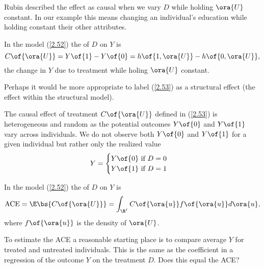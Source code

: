 Rubin described the effect as causal when we vary $D$ while holding $\ora{U}$ constant. In our example this means changing an individual's education while holding constant their other attributes.

\begin{definition}
    In the model (\ref{2.52}) the  of $D$ on $Y$ is 
    \begin{equation}
        \label{2.53}
        C\of{\ora{U}} = Y\of{1} - Y\of{0} = h\of{1, \ora{U}} - h\of{0, \ora{U}},
    \end{equation}
    the change in $Y$ due to treatment while holing $\ora{U}$ constant.
\end{definition}
Perhaps it would be more appropriate to label (\ref{2.53}) as a structural effect (the effect within the structural model).

The causal effect of treatment $C\of{\ora{U}}$ defined in (\ref{2.53}) is heterogeneous and random as the potential outcomes $Y\of{0}$ and $Y\of{1}$ vary across individuals. We do not observe both $Y\of{0}$ and $Y\of{1}$ for a given individual but rather only the realized value 
\begin{equation}
    \notag
    Y = \begin{cases}
        Y\of{0} \text{ if } D = 0 \\
        Y\of{1} \text{ if } D = 1 \\
    \end{cases}
\end{equation}

\begin{definition}
    In the model (\ref{2.52}) the  of $D$ on $Y$ is 
    \begin{equation}
        \notag
        \operatorname{ACE} = \E\bs{C\of{\ora{U}}} = \int_{\R^\ell} C\of{{\ora{u}}} f\of{\ora{u}} d\ora{u},
    \end{equation}
    where $f\of{\ora{u}}$ is the density of $\ora{U}$.
\end{definition}

To estimate the ACE a reasonable starting place is to compare average $Y$ for treated and untreated individuals. This is the same as the coefficient in a regression of the outcome $Y$ on the
treatment $D$. Does this equal the ACE?

